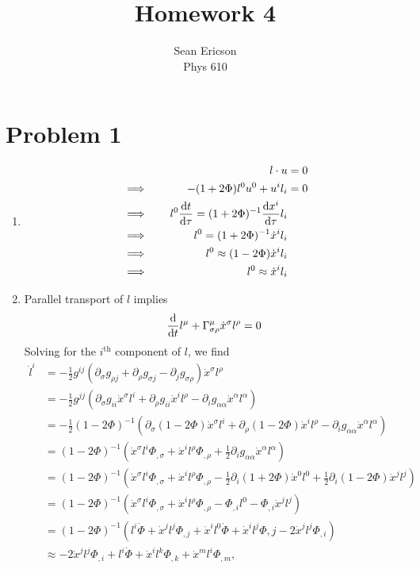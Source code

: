 \documentclass[12pt]{article}
\newcommand{\chrissym}[3]{\Gamma_{#2#3}^#1}
\begin{document}
\title{Homework 4}
\author{Sean Ericson \\ Phys 610}
\maketitle

\section*{Problem 1}
\begin{enumerate}[label=(\alph*)]
    \item
    \begin{alignat*}{3}
        &         \quad & l\cdot u &= 0 \\
        &\implies \quad & -(1 + 2\Phi)l^0u^0 + u^il_i &= 0 \\
        &\implies \quad & l^0 \dv{t}{\tau} = (1 + 2\Phi)^{-1}\dv{x^i}{\tau}l_i \\
        &\implies \quad & l^0 = (1 + 2\Phi)^{-1}\dot{x}^il_i \\
        &\implies \quad & l^0 \approx (1 - 2\Phi)\dot{x}^il_i \\
        &\implies \quad & l^0 \approx \dot{x}^il_i
    \end{alignat*}

    \item Parallel transport of $l$ implies
    \[ \dv{t}l^\mu + \chrissym{\mu}{\sigma}{\rho}\dot{x}^\sigma l^\rho = 0 \]
    Solving for the $i^\text{th}$ component of $l$, we find 
    \begin{align*}
        \dot{l}^i &= -\frac{1}{2}g^{ij}\left(\partial_\sigma g_{\rho j} + \partial_\rho g_{\sigma j} - \partial_j g_{\sigma\rho}\right)\dot{x}^\sigma l^\rho \\
        &= -\frac{1}{2}g^{jj}\left(\partial_\sigma g_{ii} \dot{x}^\sigma l^i + \partial_\rho g_{ii}\dot{x}^il^\rho - \partial_i g_{\alpha\alpha}\dot{x}^\alpha l^\alpha\right) \\
        &= -\frac{1}{2}(1 - 2\Phi)^{-1}\left(\partial_\sigma(1-2\Phi)\dot{x}^\sigma l^i + \partial_\rho (1 - 2\Phi)\dot{x}^il^\rho - \partial_i g_{\alpha\alpha}\dot{x}^\alpha l^\alpha\right) \\
        &= (1 - 2\Phi)^{-1} \left(\dot{x}^\sigma l^i \Phi_{,\sigma} + \dot{x}^i l^\rho \Phi_{,\rho} + \frac{1}{2} \partial_i g_{\alpha\alpha}\dot{x}^\alpha l^\alpha \right) \\
        &= (1 - 2\Phi)^{-1} \left(\dot{x}^\sigma l^i \Phi_{,\sigma} + \dot{x}^i l^\rho \Phi_{,\rho} -\frac{1}{2} \partial_i(1+2\Phi)\dot{x}^0 l^0 + \frac{1}{2} \partial_i(1-2\Phi)\dot{x}^j l^j \right) \\
        &= (1 - 2\Phi)^{-1} \left(\dot{x}^\sigma l^i \Phi_{,\sigma} + \dot{x}^i l^\rho \Phi_{,\rho} - \Phi_{,i} l^0 - \Phi_{,i}\dot{x}^j l^j \right) \\
        &= (1 - 2\Phi)^{-1} \left(l^i \dot{\Phi} + \dot{x}^j l^j \Phi_{,j} + \dot{x}^i l^0 \dot{\Phi} + \dot{x}^il^j \Phi{,j} - 2\dot{x}^jl^j\Phi_{,i}\right) \\
        &\approx - 2\dot{x}^jl^j\Phi_{,i} + l^i \dot{\Phi} + \dot{x}^il^k \Phi_{,k} +  \dot{x}^m l^i \Phi_{,m},
    \end{align*}


\end{enumerate}
\end{document}
